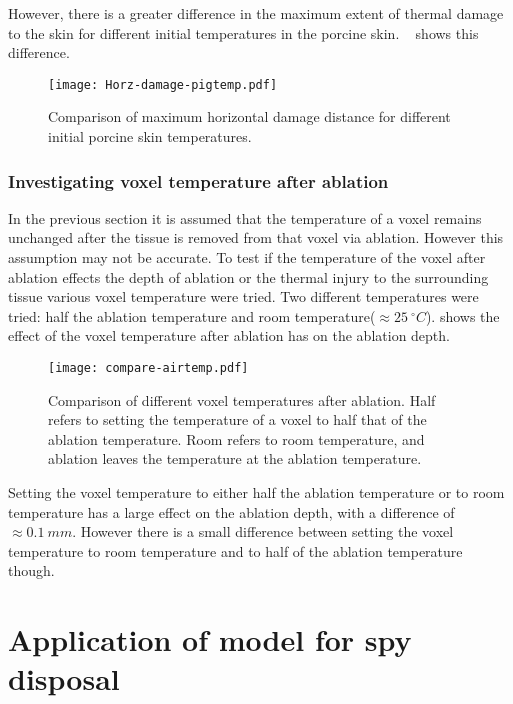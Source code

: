 However, there is a greater difference in the maximum extent of thermal damage to the skin for different initial temperatures in the porcine skin.
~ shows this difference.


\begin{figure}[!ht]
	\centering
	\texttt{[image: Horz-damage-pigtemp.pdf]}
	\caption{Comparison of maximum horizontal damage distance for different initial porcine skin temperatures.}
	\label{fig:horzdamagepig}
\end{figure}

\subsubsection{Investigating voxel temperature after ablation}

In the previous section it is assumed that the temperature of a voxel remains unchanged after the tissue is removed from that voxel via ablation.
However this assumption may not be accurate.
To test if the temperature of the voxel after ablation effects the depth of ablation or the thermal injury to the surrounding tissue various voxel temperature were tried.
Two different temperatures were tried: half the ablation temperature and room temperature($\approx 25~^{\circ}C$).
 shows the effect of the voxel temperature after ablation has on the ablation depth.

\begin{figure}[!ht]
	\centering
	\texttt{[image: compare-airtemp.pdf]}
	\caption{Comparison of different voxel temperatures after ablation. Half refers to setting the temperature of a voxel to half that of the ablation temperature. Room refers to room temperature, and ablation leaves the temperature at the ablation temperature.}
	\label{fig:comparevoxtemp}
\end{figure}

Setting the voxel temperature to either half the ablation temperature or to room temperature has a large effect on the ablation depth, with a difference of $\approx 0.1~mm$.
However there is a small difference between setting the voxel temperature to room temperature and to half of the ablation temperature though.

\section{Application of model for spy disposal}

